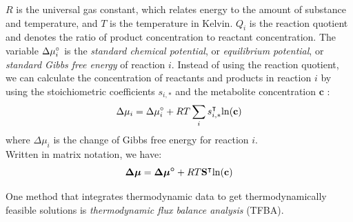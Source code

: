 $R$ is the universal gas constant, which relates energy to the amount of substance and temperature, and $T$ is the temperature in Kelvin. $Q_i$ is the reaction quotient and denotes the ratio of product concentration to reactant concentration. The variable $\Delta \mu \degree_i$ is the \textit{standard chemical potential}, or \textit{equilibrium potential}, or \textit{standard Gibbs free energy} of reaction $i$.
Instead of using the reaction quotient, we can calculate the concentration of reactants and products in reaction $i$ by using the stoichiometric coefficients $s_{i,*}$ and the metabolite concentration $\mathbf c$ \cite{noor_removing_2018}:
\begin{equation*}
    \Delta \mu_i = \Delta \mu \degree_i + RT \sum_{i} s_{i,*}^\intercal \mathrm{ln} (\mathbf c)
    \label{Eq:lawOfThermodynamics}
\end{equation*}
where $\Delta \mu_i$ is the change of Gibbs free energy for reaction $i$. \\
Written in matrix notation, we have:
\begin{equation}
   \boldsymbol{\Delta \mu} = \boldsymbol{\Delta \mu \degree} + RT \mathbf S^\intercal \mathrm{ln}(\mathbf c)
\end{equation}

One method that integrates thermodynamic data to get thermodynamically feasible solutions is \textit{thermodynamic flux balance analysis} (\textsf{TFBA}). 

